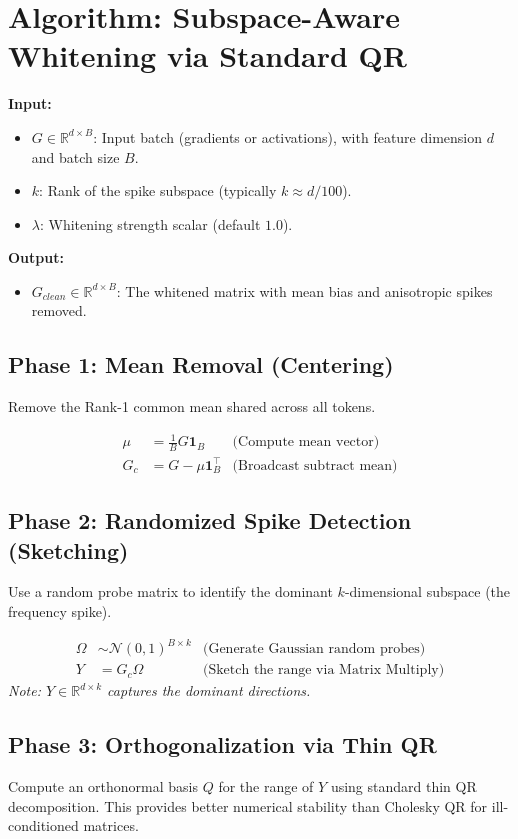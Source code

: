 \section{Algorithm: Subspace-Aware Whitening via Standard QR}

\textbf{Input:}
\begin{itemize}
    \item $G \in \mathbb{R}^{d \times B}$: Input batch (gradients or activations), with feature dimension $d$ and batch size $B$.
    \item $k$: Rank of the spike subspace (typically $k \approx d/100$).
    \item $\lambda$: Whitening strength scalar (default $1.0$).
\end{itemize}

\textbf{Output:}
\begin{itemize}
    \item $G_{clean} \in \mathbb{R}^{d \times B}$: The whitened matrix with mean bias and anisotropic spikes removed.
\end{itemize}

\subsection*{Phase 1: Mean Removal (Centering)}
Remove the Rank-1 common mean shared across all tokens.

\begin{align}
    \mu &= \frac{1}{B} G \mathbf{1}_B & \text{(Compute mean vector)} \\
    G_c &= G - \mu \mathbf{1}_B^\top & \text{(Broadcast subtract mean)}
\end{align}

\subsection*{Phase 2: Randomized Spike Detection (Sketching)}
Use a random probe matrix to identify the dominant $k$-dimensional subspace (the frequency spike).

\begin{align}
    \Omega &\sim \mathcal{N}(0, 1)^{B \times k} & \text{(Generate Gaussian random probes)} \\
    Y &= G_c \Omega & \text{(Sketch the range via Matrix Multiply)}
\end{align}
\textit{Note: $Y \in \mathbb{R}^{d \times k}$ captures the dominant directions.}

\subsection*{Phase 3: Orthogonalization via Thin QR}
Compute an orthonormal basis $Q$ for the range of $Y$ using standard thin QR decomposition. This provides better numerical stability than Cholesky QR for ill-conditioned matrices.

